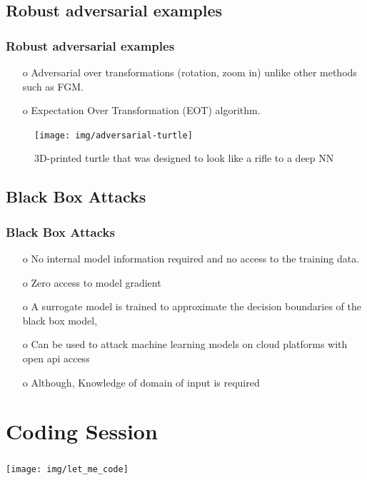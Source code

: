 \documentclass[12pt]{beamer}
\begin{document}
\subsection{Robust adversarial examples}
\begin{frame}
\frametitle{Robust adversarial examples}
\begin{itemize}
	\item[o] Adversarial over transformations (rotation, zoom in) unlike other methods such as FGM.
	\item[o] Expectation Over Transformation (EOT) algorithm.
\end{itemize}

\begin{figure}
	\centering
	\texttt{[image: img/adversarial-turtle]}
	\caption{3D-printed turtle that was designed to look like a rifle to a deep NN\protect\footnotemark}
	\label{fig:adversarial-turtle}
\end{figure}

\end{frame}

\subsection{Black Box Attacks}
\begin{frame}
\frametitle{Black Box Attacks}
\begin{itemize}
	\item[o] No internal model information required and no access to the training data. \pause
	\item[o] Zero access to model gradient \pause
	\item[o] A surrogate model is trained to approximate the decision boundaries of the black box model, \pause
	\item[o] Can be used to attack machine learning models on cloud platforms with open api access\protect\footnotemark \pause
	\item[o] Although, Knowledge of domain of input is required \pause
\end{itemize}

\end{frame}

\section{Coding Session}
\begin{frame}
\frametitle{}
\begin{center}
	\texttt{[image: img/let\_me\_code]}
\end{center}

\end{frame}
\end{document}

